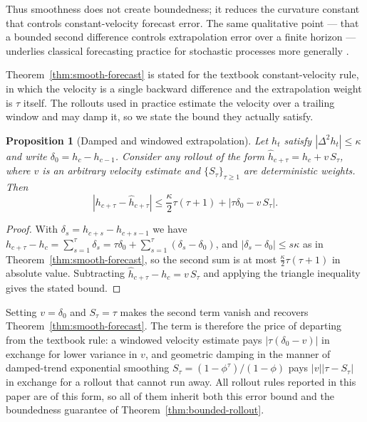 \documentclass[a4paper,fleqn]{cas-sc}
\newtheorem{proposition}{Proposition}
\begin{document}
Thus smoothness does not create boundedness; it reduces the curvature constant
that controls constant-velocity forecast error. The same qualitative point ---
that a bounded second difference controls extrapolation error over a finite
horizon --- underlies classical forecasting practice for stochastic processes
more generally \citep{brockwell2016introduction}.

Theorem~\ref{thm:smooth-forecast} is stated for the textbook
constant-velocity rule, in which the velocity is a single backward difference
and the extrapolation weight is $\tau$ itself. The rollouts used in practice
estimate the velocity over a trailing window and may damp it, so we state the
bound they actually satisfy.

\begin{proposition}[Damped and windowed extrapolation]
\label{prop:general-extrap}
Let $h_t$ satisfy $|\Delta^2h_t|\le\kappa$ and write
$\delta_0=h_c-h_{c-1}$. Consider any rollout of the form
$\hat{h}_{c+\tau}=h_c+v\,S_\tau$, where $v$ is an arbitrary velocity
estimate and $\{S_\tau\}_{\tau\ge1}$ are deterministic weights. Then
\[
    |h_{c+\tau}-\hat{h}_{c+\tau}|
    \le
    \frac{\kappa}{2}\tau(\tau+1)
    +
    |\tau\delta_0-v\,S_\tau| .
\]
\end{proposition}

\begin{proof}
With $\delta_s=h_{c+s}-h_{c+s-1}$ we have
$h_{c+\tau}-h_c=\sum_{s=1}^{\tau}\delta_s
=\tau\delta_0+\sum_{s=1}^{\tau}(\delta_s-\delta_0)$, and
$|\delta_s-\delta_0|\le s\kappa$ as in
Theorem~\ref{thm:smooth-forecast}, so the second sum is at most
$\frac{\kappa}{2}\tau(\tau+1)$ in absolute value. Subtracting
$\hat{h}_{c+\tau}-h_c=v\,S_\tau$ and applying the triangle inequality gives the
stated bound.
\end{proof}

Setting $v=\delta_0$ and $S_\tau=\tau$ makes the second term vanish and recovers
Theorem~\ref{thm:smooth-forecast}. The term is therefore the price of departing
from the textbook rule: a windowed velocity estimate pays $|\tau(\delta_0-v)|$
in exchange for lower variance in $v$, and geometric damping in the manner of
damped-trend exponential smoothing \citep{gardner1985forecasting}
$S_\tau=(1-\phi^\tau)/(1-\phi)$ pays $|v||\tau-S_\tau|$ in exchange for a
rollout that cannot run away. All rollout rules reported in this paper are of
this form, so all of them inherit both this error bound and the boundedness
guarantee of Theorem~\ref{thm:bounded-rollout}.
\end{document}

